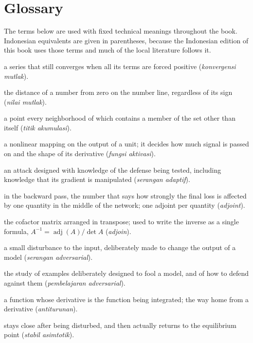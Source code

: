 \chapter{Glossary}
\label{app:glosarium}

The terms below are used with fixed technical meanings throughout the book. Indonesian
equivalents are given in parentheses, because the Indonesian edition of this book uses those
terms and much of the local literature follows it.

\begin{description}[style=nextline,itemsep=0.35em]
  \item[Absolute convergence] a series that still converges when all its terms are forced positive (\emph{konvergensi mutlak}).
  \item[Absolute value] the distance of a number from zero on the number line, regardless of its sign (\emph{nilai mutlak}).
  \item[Accumulation point] a point every neighborhood of which contains a member of the set other than itself (\emph{titik akumulasi}).
  \item[Activation function] a nonlinear mapping on the output of a unit; it decides how much signal is passed on and the shape of its derivative (\emph{fungsi aktivasi}).
  \item[Adaptive attack] an attack designed with knowledge of the defense being tested, including knowledge that its gradient is manipulated (\emph{serangan adaptif}).
  \item[Adjoint] in the backward pass, the number that says how strongly the final loss is affected by one quantity in the middle of the network; one adjoint per quantity (\emph{adjoint}).
  \item[Adjugate] the cofactor matrix arranged in transpose; used to write the inverse as a single formula, $A^{-1}=\operatorname{adj}(A)/\det A$ (\emph{adjoin}).
  \item[Adversarial example] a small disturbance to the input, deliberately made to change the output of a model (\emph{serangan adversarial}).
  \item[Adversarial learning] the study of examples deliberately designed to fool a model, and of how to defend against them (\emph{pembelajaran adversarial}).
  \item[Antiderivative] a function whose derivative is the function being integrated; the way home from a derivative (\emph{antiturunan}).
  \item[Asymptotically stable] stays close after being disturbed, and then actually returns to the equilibrium point (\emph{stabil asimtotik}).

\end{description}
